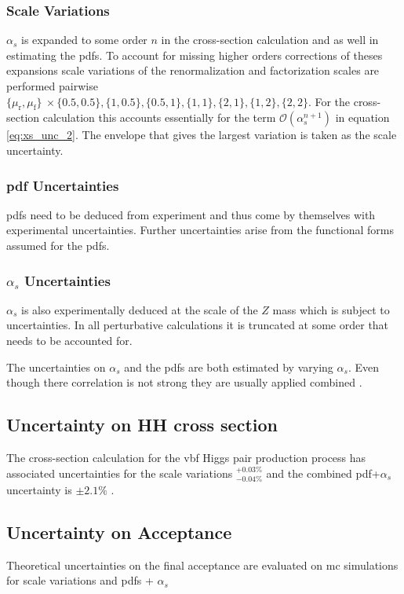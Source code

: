 \subsubsection*{Scale Variations}
$\alpha_s$ is expanded to some order $n$ in the cross-section calculation and as well in estimating the \acp{pdf}. To account for missing higher orders corrections of theses expansions scale variations of the renormalization and factorization scales are performed pairwise $\{\mu_\text{r},\mu_\text{f}\}\ \times \{0.5,0.5\}, \{1,0.5\}, \{0.5,1\}, \{1,1\}, \{2,1\}, \{1,2\}, \{2,2\}$. For the cross-section calculation this accounts essentially for the term $\mathcal{O}(\alpha_s^{n+1})$ in equation \ref{eq:xs_unc_2}. The envelope that gives the largest variation is taken as the scale uncertainty.

\subsubsection*{\ac{pdf} Uncertainties}
\acp{pdf} need to be deduced from experiment and thus come by themselves with experimental uncertainties. Further uncertainties arise from the functional forms assumed for the \acp{pdf}.

\subsubsection*{$\alpha_s$ Uncertainties}
$\alpha_s$ is also experimentally deduced at the scale of the $Z$ mass which is subject to uncertainties. In all perturbative calculations it is truncated at some order that needs to be accounted for.

The uncertainties on $\alpha_s$ and the \acp{pdf} are both estimated by varying $\alpha_s$. Even though there correlation is not strong they are usually applied combined \citep{unc_recipe}.

\subsection{Uncertainty on HH cross section}
The cross-section calculation for the \ac{vbf} Higgs pair production process has associated uncertainties for the scale variations $^{+0.03\%}_{-0.04\%}$ and the combined \ac{pdf}+$\alpha_s$ uncertainty is $\pm 2.1\%$ \citep{de2016arxiv}.

\subsection{Uncertainty on Acceptance}
Theoretical uncertainties on the final acceptance are evaluated on \ac{mc} simulations for scale variations and \acp{pdf} + $\alpha_s$ 

